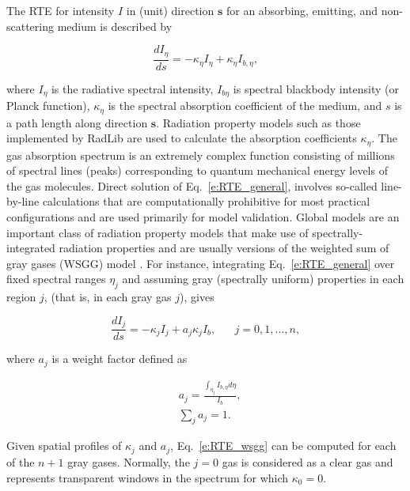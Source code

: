 \documentclass[preprint,12pt]{elsarticle}
\newcounter{bla}
\begin{document}
The RTE for intensity $I$ in (unit) direction $\mathbf{s}$ for an absorbing, emitting, and non-scattering medium is described by
% 
\begin{linenomath}
\begin{equation} \label{e:RTE_general}
    \frac{dI_{\eta}}{ds} = -\kappa_{\eta}I_{\eta} + \kappa_{\eta}I_{b,\eta},
\end{equation}
\end{linenomath}
%
where $I_{\eta}$ is the radiative spectral intensity, 
$I_{b\eta}$ is spectral blackbody intensity (or Planck function), 
$\kappa_{\eta}$ is the spectral absorption coefficient of the medium, and $s$ is a path length along direction $\mathbf{s}$. Radiation property models such as those implemented by RadLib are used to calculate the absorption coefficients $\kappa_{\eta}$. 
%
The gas absorption spectrum is an extremely complex function consisting of millions of spectral lines (peaks) corresponding to quantum mechanical energy levels of the gas molecules.
Direct solution of Eq.~\ref{e:RTE_general}, involves so-called line-by-line calculations that are computationally prohibitive for most practical configurations and are used primarily for model validation. Global models are an important class of radiation property models that make use of spectrally-integrated radiation properties and are usually versions of the weighted sum of gray gases (WSGG) model \cite{Hottel_1967,Modest_2013}. For instance, integrating Eq.~\ref{e:RTE_general} over fixed spectral ranges $\eta_j$ and assuming gray (spectrally uniform) properties in each region $j$, (that is, in each gray gas $j$), gives
%
\begin{linenomath}
\begin{equation} \label{e:RTE_wsgg}
	\frac{dI_j}{ds} = -\kappa_jI_j + a_j\kappa_jI_b, \hspace{20pt} j=0,1,...,n,
\end{equation}
\end{linenomath}
%
where $a_j$ is a weight factor defined as
%
\begin{linenomath}
\begin{align}
    &a_j= \frac{\int_{\eta_j}I_{b,\eta}d\eta}{I_b},\\
    &\sum_j a_j = 1.
\end{align}
\end{linenomath}
%
Given spatial profiles of $\kappa_j$ and $a_j$, Eq.~\ref{e:RTE_wsgg} can be computed for each of the $n+1$ gray gases. Normally, the $j=0$ gas is considered as a clear gas and represents transparent windows in the spectrum for which $\kappa_0=0$.
\end{document}
